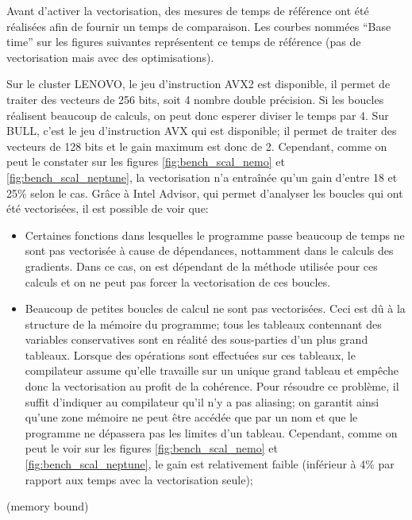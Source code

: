 Avant d'activer la vectorisation, des mesures de temps de référence ont été réalisées afin de fournir un temps de comparaison. Les courbes nommées ``Base time'' sur les figures suivantes représentent ce temps de référence (pas de vectorisation mais avec des optimisations).

Sur le cluster LENOVO, le jeu d'instruction AVX2 est disponible, il permet de traiter des vecteurs de 256 bits, soit 4 nombre double précision. Si les boucles réalisent beaucoup de calculs, on peut donc esperer diviser le temps par 4. Sur BULL, c'est le jeu d'instruction AVX qui est disponible; il permet de traiter des vecteurs de 128 bits et le gain maximum est donc de 2. Cependant, comme on peut le constater sur les figures \ref{fig:bench_scal_nemo} et \ref{fig:bench_scal_neptune}, la vectorisation n'a entraînée qu'un gain d'entre 18 et 25\% selon le cas. Grâce à Intel Advisor, qui permet d'analyser les boucles qui ont été vectorisées, il est possible de voir que:
\begin{itemize}
\item Certaines fonctions dans lesquelles le programme passe beaucoup de temps ne sont pas vectorisée à cause de dépendances, nottamment dans le calculs des gradients. Dans ce cas, on est dépendant de la méthode utilisée pour ces calculs et on ne peut pas forcer la vectorisation de ces boucles.
\item Beaucoup de petites boucles de calcul ne sont pas vectorisées. Ceci est dû à la structure de la mémoire du programme; tous les tableaux contennant des variables conservatives sont en réalité des sous-parties d'un plus grand tableaux. Lorsque des opérations sont effectuées sur ces tableaux, le compilateur assume qu'elle travaille sur un unique grand tableau et empêche donc la vectorisation au profit de la cohérence. Pour résoudre ce problème, il suffit d'indiquer au compilateur qu'il n'y a pas aliasing; on garantit ainsi qu'une zone mémoire ne peut être accédée que par un nom et que le programme ne dépassera pas les limites d'un tableau. Cependant, comme on peut le voir sur les figures \ref{fig:bench_scal_nemo} et \ref{fig:bench_scal_neptune}, le gain est relativement faible (inférieur à 4\% par rapport aux temps avec la vectorisation seule); 
\end{itemize}



(memory bound)



